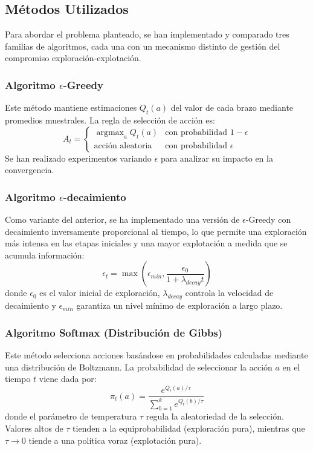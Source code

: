 \subsection{Métodos Utilizados}
Para abordar el problema planteado, se han implementado y comparado tres familias de algoritmos, cada una con un mecanismo distinto de gestión del compromiso exploración-explotación.

\subsubsection{Algoritmo $\epsilon$-Greedy}
Este método mantiene estimaciones $Q_t(a)$ del valor de cada brazo mediante promedios muestrales. La regla de selección de acción es:
\begin{equation*}
    A_t = \begin{cases}
    \operatorname{argmax}_a Q_t(a) & \text{con probabilidad } 1 - \epsilon \\
    \text{acción aleatoria} & \text{con probabilidad } \epsilon
    \end{cases}
\end{equation*}
Se han realizado experimentos variando $\epsilon$ para analizar su impacto en la convergencia.



\subsubsection{Algoritmo $\epsilon$-decaimiento}
Como variante del anterior, se ha implementado una versión de $\epsilon$-Greedy con decaimiento inversamente proporcional al tiempo, lo que permite una exploración más intensa en las etapas iniciales y una mayor explotación a medida que se acumula información:
\begin{equation*}
    \epsilon_t = \max\left(\epsilon_{min}, \frac{\epsilon_0}{1 + \lambda_{decay} t}\right)
\end{equation*}
donde $\epsilon_0$ es el valor inicial de exploración, $\lambda_{decay}$ controla la velocidad de decaimiento y $\epsilon_{min}$ garantiza un nivel mínimo de exploración a largo plazo.


\subsubsection{Algoritmo Softmax (Distribución de Gibbs)}
Este método selecciona acciones basándose en probabilidades calculadas mediante una distribución de Boltzmann. La probabilidad de seleccionar la acción $a$ en el tiempo $t$ viene dada por:
\begin{equation*}
    \pi_t(a) = \frac{e^{Q_t(a)/\tau}}{\sum_{b=1}^{k} e^{Q_t(b)/\tau}}
\end{equation*}
donde el parámetro de temperatura $\tau$ regula la aleatoriedad de la selección. Valores altos de $\tau$ tienden a la equiprobabilidad (exploración pura), mientras que $\tau \to 0$ tiende a una política voraz (explotación pura).

